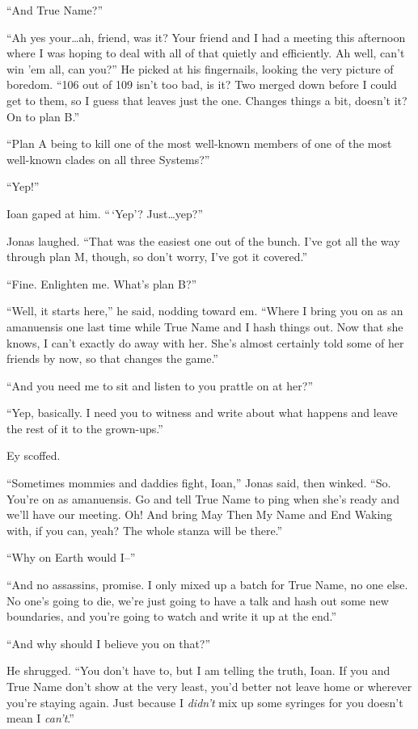 ``And True Name?''

``Ah yes your\ldots ah, friend, was it? Your friend and I had a meeting this afternoon where I was hoping to deal with all of that quietly and efficiently. Ah well, can't win 'em all, can you?'' He picked at his fingernails, looking the very picture of boredom. ``106 out of 109 isn't too bad, is it? Two merged down before I could get to them, so I guess that leaves just the one. Changes things a bit, doesn't it? On to plan B.''

``Plan A being to kill one of the most well-known members of one of the most well-known clades on all three Systems?''

``Yep!''

Ioan gaped at him. ``\,`Yep'? Just\ldots yep?''

Jonas laughed. ``That was the easiest one out of the bunch. I've got all the way through plan M, though, so don't worry, I've got it covered.''

``Fine. Enlighten me. What's plan B?''

``Well, it starts here,'' he said, nodding toward em. ``Where I bring you on as an amanuensis one last time while True Name and I hash things out. Now that she knows, I can't exactly do away with her. She's almost certainly told some of her friends by now, so that changes the game.''

``And you need me to sit and listen to you prattle on at her?''

``Yep, basically. I need you to witness and write about what happens and leave the rest of it to the grown-ups.''

Ey scoffed.

``Sometimes mommies and daddies fight, Ioan,'' Jonas said, then winked. ``So. You're on as amanuensis. Go and tell True Name to ping when she's ready and we'll have our meeting. Oh! And bring May Then My Name and End Waking with, if you can, yeah? The whole stanza will be there.''

``Why on Earth would I--''

``And no assassins, promise. I only mixed up a batch for True Name, no one else. No one's going to die, we're just going to have a talk and hash out some new boundaries, and you're going to watch and write it up at the end.''

``And why should I believe you on that?''

He shrugged. ``You don't have to, but I am telling the truth, Ioan. If you and True Name don't show at the very least, you'd better not leave home or wherever you're staying again. Just because I \emph{didn't} mix up some syringes for you doesn't mean I \emph{can't}.''

